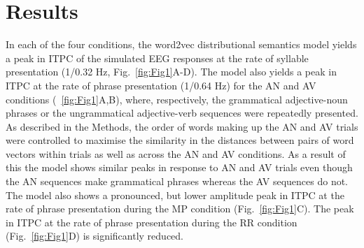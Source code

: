 \documentclass[10pt,letterpaper]{article}
\begin{document}
\section*{Results}
In each of the four conditions, the word2vec distributional semantics model yields a peak in ITPC of the simulated EEG responses at the rate of syllable presentation (1/0.32 Hz, Fig.~\ref{fig:Fig1}A-D). The model also yields a peak in ITPC at the rate of phrase presentation (1/0.64 Hz) for the AN and AV conditions (~\ref{fig:Fig1}A,B), where, respectively, the grammatical adjective-noun phrases or the ungrammatical adjective-verb sequences were repeatedly presented. As described in the Methods, the order of words making up the AN and AV trials were controlled to maximise the similarity in the distances between pairs of word vectors within trials as well as across the AN and AV conditions. As a result of this the model shows similar peaks in response to AN and AV trials even though the AN sequences make grammatical phrases whereas the AV sequences do not. The model also shows a pronounced, but lower amplitude peak in ITPC at the rate of phrase presentation during the MP condition (Fig.~\ref{fig:Fig1}C). The peak in ITPC at the rate of phrase presentation during the RR condition (Fig.~\ref{fig:Fig1}D) is significantly reduced.
\end{document}
